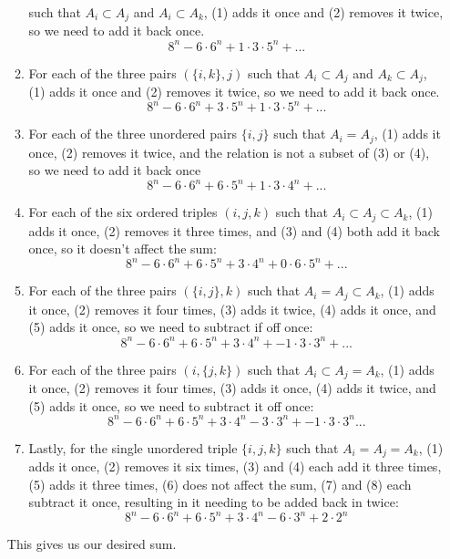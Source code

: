 \documentclass{article}
\newenvironment{solution}[1][Solution.]{\begin{trivlist}
\item[\hskip \labelsep {\bfseries #1}]}{\end{trivlist}}
\begin{document}
\begin{solution}
\begin{enumerate}[(i)]
\begin{enumerate}[(1)]
    such that $A_i \subset A_j$ and $A_i \subset A_k$,
    (1) adds it once and
    (2) removes it twice,
    so we need to add it back once. \[
      8^n - 6\cdot6^n + 1\cdot3\cdot5^n + ...
    \]
    \item For each of the three pairs $(\{i, k\}, j)$
    such that $A_i \subset A_j$ and $A_k \subset A_j$,
    (1) adds it once and
    (2) removes it twice,
    so we need to add it back once. \[
      8^n - 6\cdot6^n + 3\cdot5^n + 1\cdot3\cdot5^n + ...
    \]
    \item For each of the three unordered pairs $\{i, j\}$
    such that $A_i = A_j$,
    (1) adds it once,
    (2) removes it twice, and the relation is not a subset of (3) or (4),
    so we need to add it back once \[
      8^n - 6\cdot6^n + 6\cdot5^n + 1\cdot3\cdot4^n + ...
    \]
    \item For each of the six ordered triples $(i, j, k)$
    such that $A_i \subset A_j \subset A_k$,
    (1) adds it once,
    (2) removes it three times, and
    (3) and (4) both add it back once,
    so it doesn't affect the sum: \[
      8^n - 6\cdot6^n + 6\cdot5^n + 3\cdot4^n + 0\cdot6\cdot5^n + ...
    \]
    \item For each of the three pairs $(\{i, j\}, k)$
    such that $A_i = A_j \subset A_k$,
    (1) adds it once,
    (2) removes it four times,
    (3) adds it twice,
    (4) adds it once, and
    (5) adds it once,
    so we need to subtract if off once: \[
      8^n - 6\cdot6^n + 6\cdot5^n + 3\cdot4^n + -1\cdot3\cdot3^n + ...
    \]
    \item For each of the three pairs $(i, \{j, k\})$
    such that $A_i \subset A_j = A_k$,
    (1) adds it once,
    (2) removes it four times,
    (3) adds it once,
    (4) adds it twice, and
    (5) adds it once,
    so we need to subtract it off once: \[
      8^n - 6\cdot6^n + 6\cdot5^n + 3\cdot4^n -3\cdot3^n + -1\cdot3\cdot3^n...
    \]
    \item Lastly, for the single unordered triple $\{ i, j, k \}$
    such that $A_i = A_j = A_k$,
    (1) adds it once,
    (2) removes it six times,
    (3) and (4) each add it three times,
    (5) adds it three times,
    (6) does not affect the sum,
    (7) and (8) each subtract it once,
    resulting in it needing to be added back in twice: \[
      8^n - 6\cdot6^n + 6\cdot5^n + 3\cdot4^n - 6\cdot3^n + 2\cdot2^n
    \]
    \end{enumerate}
    This gives us our desired sum.
  \end{enumerate}
\end{solution}
\end{document}

